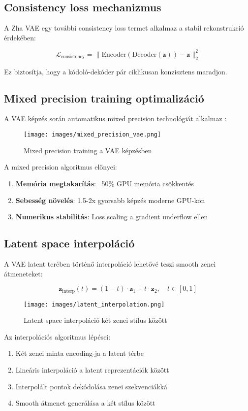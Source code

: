 \subsection{Consistency loss mechanizmus}
A Zha VAE egy további consistency loss termet alkalmaz a stabil rekonstrukció érdekében:

\[
\mathcal{L}_{\text{consistency}} = \|\text{Encoder}(\text{Decoder}(\mathbf{z})) - \mathbf{z}\|_2^2
\]

Ez biztosítja, hogy a kódoló-dekóder pár ciklikusan konzisztens maradjon.

\subsection{Mixed precision training optimalizáció}
A VAE képzés során automatikus mixed precision technológiát alkalmaz \cite{torch2023}:

\begin{figure}[h]
\centering
\texttt{[image: images/mixed\_precision\_vae.png]}
\caption{Mixed precision training a VAE képzésben}
\label{fig:mixed_precision}
\end{figure}

A mixed precision algoritmus előnyei:
\begin{enumerate}
\item \textbf{Memória megtakarítás}: ~50\% GPU memória csökkentés
\item \textbf{Sebesség növelés}: 1.5-2x gyorsabb képzés moderne GPU-kon
\item \textbf{Numerikus stabilitás}: Loss scaling a gradient underflow ellen
\end{enumerate}

\subsection{Latent space interpoláció}
A VAE latent terében történő interpoláció lehetővé teszi smooth zenei átmeneteket:

\[
\mathbf{z}_{\text{interp}}(t) = (1-t) \cdot \mathbf{z}_1 + t \cdot \mathbf{z}_2, \quad t \in [0,1]
\]

\begin{figure}[h]
\centering
\texttt{[image: images/latent\_interpolation.png]}
\caption{Latent space interpoláció két zenei stílus között}
\label{fig:interpolation}
\end{figure}

Az interpolációs algoritmus lépései:
\begin{enumerate}
\item Két zenei minta encoding-ja a latent térbe
\item Lineáris interpoláció a latent reprezentációk között
\item Interpolált pontok dekódolása zenei szekvenciákká
\item Smooth átmenet generálása a két stílus között
\end{enumerate}

